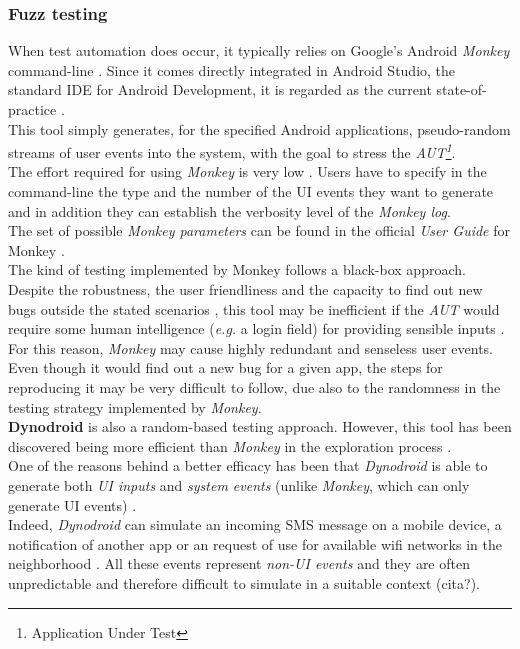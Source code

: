 \subsubsection{Fuzz testing}
When test automation does occur, it typically relies on Google's Android \textit{Monkey} command-line \cite{monkey}. Since it comes directly integrated in Android Studio, the standard IDE for Android Development, it is regarded as the current state-of-practice \cite{Mahmood2014}.\\
This tool simply generates, for the specified Android applications, pseudo-random streams of user events into the system, with the goal to stress the \textit{AUT\footnote{Application Under Test}}\cite{monkey}. \\ 
The effort required for using \textit{Monkey} is very low \cite{areWeThereYet}. Users have to specify in the command-line the type and the number of the UI events they want to generate and in addition they can establish the verbosity level of the \textit{Monkey log}. \\
The set of possible \textit{Monkey parameters} can be found in the official \textit{User Guide} for Monkey \cite{monkey}. \\
The kind of testing implemented by Monkey follows a black-box approach. 
Despite the robustness, the user friendliness \cite{areWeThereYet, dynodroid} and the capacity to find out new bugs outside the stated scenarios  \cite{monkey_2}, this tool may be inefficient if the \textit{AUT} would require some human intelligence (\textit{e.g.} a login field) for providing sensible inputs \cite{dynodroid}. \\
For this reason, \textit{Monkey} may cause highly redundant and senseless user events. Even though it would find out a new bug for a given app, the steps for reproducing it may be very difficult to follow, due also to the randomness in the testing strategy implemented by \textit{Monkey}\cite{monkey_2}. \\
\textbf{Dynodroid} \cite{dynodroid} is also a random-based testing approach. However, this tool has been discovered being more efficient than \textit{Monkey} in the exploration process  \cite{areWeThereYet}. \\
One of the reasons behind a better efficacy has been that \textit{Dynodroid} is able to generate both \textit{UI inputs} and \textit{system events} (unlike \textit{Monkey}, which can only generate UI events) \cite{areWeThereYet}. \\  
Indeed, \textit{Dynodroid} can simulate an incoming SMS message on a mobile device, a notification of another app or an request of use for available wifi networks in the neighborhood \cite{dynodroid}. All these events represent \textit{non-UI events} and they are often unpredictable and therefore difficult to simulate in a suitable context (cita?). \\

